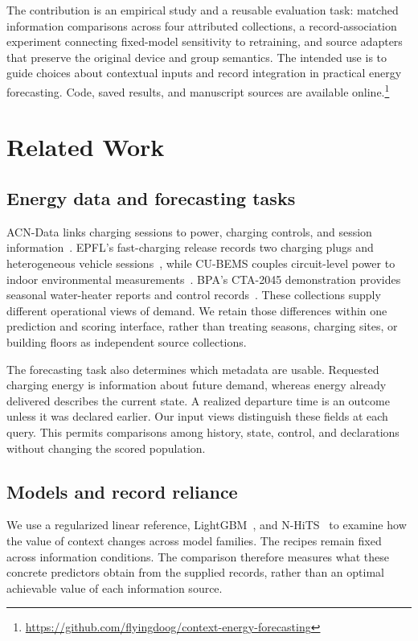 \documentclass[conference,a4paper]{IEEEtran}
\begin{document}
The contribution is an empirical study and a reusable evaluation task:
matched information comparisons across four attributed collections, a
record-association experiment connecting fixed-model sensitivity to
retraining, and source adapters that preserve the original device and group
semantics. The intended use is to guide choices about contextual inputs and
record integration in practical energy forecasting. Code, saved results,
and manuscript sources are available online.\footnote{\url{https://github.com/flyingdoog/context-energy-forecasting}}

\section{Related Work}
\subsection{Energy data and forecasting tasks}
ACN-Data links charging sessions to power, charging controls, and session
information~\cite{lee2019acndata}. EPFL's fast-charging release records two
charging plugs and heterogeneous vehicle sessions~\cite{desl2025level3},
while CU-BEMS couples circuit-level power to indoor environmental
measurements~\cite{pipattanasomporn2020cubems}. BPA's CTA-2045 demonstration
provides seasonal water-heater reports and control
records~\cite{bpa_cta2045}. These collections supply different operational
views of demand. We retain those differences within one prediction and
scoring interface, rather than treating seasons, charging sites, or building
floors as independent source collections.

The forecasting task also determines which metadata are usable. Requested
charging energy is information about future demand, whereas energy already
delivered describes the current state. A realized departure time is an
outcome unless it was declared earlier. Our input views distinguish these
fields at each query. This permits comparisons among history, state,
control, and declarations without changing the scored population.

\subsection{Models and record reliance}
We use a regularized linear reference, LightGBM~\cite{ke2017lightgbm}, and
N-HiTS~\cite{challu2023nhits} to examine how the value of context changes
across model families. The recipes remain fixed across information
conditions. The comparison therefore measures what these concrete
predictors obtain from the supplied records, rather than an optimal
achievable value of each information source.
\end{document}
